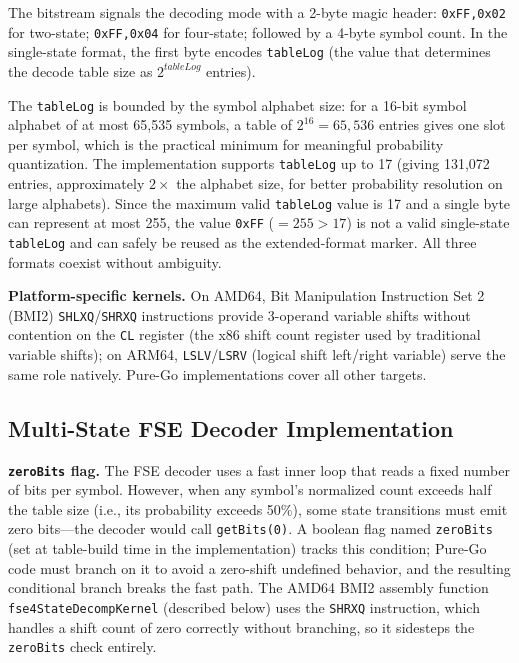 \documentclass[journal]{IEEEtran}
\begin{document}
The bitstream signals the decoding mode with a 2-byte magic header:
\texttt{0xFF,0x02} for two-state; \texttt{0xFF,0x04} for four-state; followed
by a 4-byte symbol count. In the single-state format, the first byte encodes
\texttt{tableLog} (the value that determines the decode table size as
$2^{\textit{tableLog}}$ entries).

The \texttt{tableLog} is bounded by the symbol alphabet size: for a 16-bit
symbol alphabet of at most 65,535 symbols, a table of $2^{16} = 65{,}536$
entries gives one slot per symbol, which is the practical minimum for
meaningful probability quantization. The implementation supports
\texttt{tableLog} up to 17 (giving 131,072 entries, approximately $2\times$
the alphabet size, for better probability resolution on large alphabets).
Since the maximum valid \texttt{tableLog} value is 17 and a single byte can
represent at most 255, the value \texttt{0xFF} ($= 255 > 17$) is not a valid
single-state \texttt{tableLog} and can safely be reused as the
extended-format marker. All three formats coexist without ambiguity.

\textbf{Platform-specific kernels.} On AMD64, Bit Manipulation Instruction
Set 2 (BMI2) \texttt{SHLXQ}/\texttt{SHRXQ} instructions provide 3-operand
variable shifts without contention on the \texttt{CL} register (the x86 shift
count register used by traditional variable shifts); on ARM64,
\texttt{LSLV}/\texttt{LSRV} (logical shift left/right variable) serve the same
role natively. Pure-Go implementations cover all other targets.

\subsection{Multi-State FSE Decoder Implementation}

\textbf{\texttt{zeroBits} flag.} The FSE decoder uses a fast inner loop that
reads a fixed number of bits per symbol. However, when any symbol's
normalized count exceeds half the table size (i.e., its probability exceeds
50\%), some state transitions must emit zero bits---the decoder would call
\texttt{getBits(0)}. A boolean flag named \texttt{zeroBits} (set at
table-build time in the implementation) tracks this condition; Pure-Go code
must branch on it to avoid a zero-shift undefined behavior, and the resulting
conditional branch breaks the fast path. The AMD64 BMI2 assembly function
\texttt{fse4StateDecompKernel} (described below) uses the \texttt{SHRXQ}
instruction, which handles a shift count of zero correctly without branching,
so it sidesteps the \texttt{zeroBits} check entirely.
\end{document}
